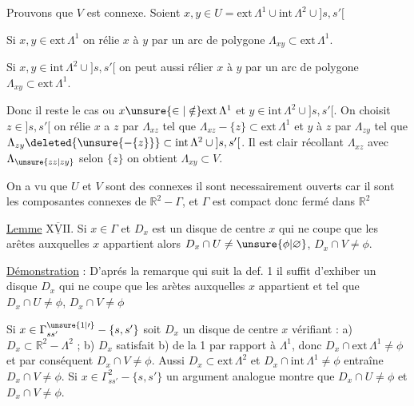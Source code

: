 Prouvons que $V$ est connexe. Soient $x,y\in U=\mathrm{ext}\,\Lambda^{1}\cup\mathrm{int}\,\Lambda^{2}\cup{]s,s'[}$

Si $x,y\in\mathrm{ext}\,\Lambda^{1}$ on rélie $x$ à $y$ par un arc de polygone $\Lambda_{xy}\subset\mathrm{ext}\,\Lambda^{1}$.

Si $x,y\in\mathrm{int}\,\Lambda^{2}\cup{]s,s'[}$ on peut aussi rélier $x$ à $y$ par un arc de polygone $\Lambda_{xy}\subset\mathrm{ext}\,\Lambda^{1}$.

Donc il reste le cas ou $x\unsure{\in|\notin}\mathrm{ext}\,\Lambda^{1}$ et $y\in\mathrm{int}\,\Lambda^{2}\cup{]s,s'[}$. On choisit $z\in{]s,s'[}$ on rélie $x$ a $z$ par $\Lambda_{xz}$ tel que $\Lambda_{xz}-\{z\}\subset\mathrm{ext}\,\Lambda^{1}$ et $y$ à $z$ par $\Lambda_{zy}$ tel que $\Lambda_{zy}\deleted{\unsure{-\{z\}}}\subset\mathrm{int}\,\Lambda^{2}\cup{]s,s'[}$. Il est clair  récollant $\Lambda_{xz}$ avec $\Lambda_{\unsure{zz|zy}}$ selon $\{z\}$ on obtient $\Lambda_{xy}\subset V$.

On a vu que $U$ et $V$ sont des connexes il sont necessairement ouverts car il sont les composantes connexes de $\mathbb{R}^{2}-\Gamma$, et $\Gamma$ est compact donc fermé dans $\mathbb{R}^{2}$\unsure{,|;|)}

\hfill {}
\uline{Lemme} $\underline{\overline{\mathrm{XVII}}}$. Si $x\in\Gamma$ et $D_x$ est un disque de centre $x$ qui ne coupe que les arêtes auxquelles $x$ appartient alors $D_x\cap U\ne\unsure{\phi|\varnothing}$, $D_x\cap V\ne\phi$.

\uline{Démonstration} : D'aprés la remarque qui suit la def. 1 il suffit d'exhiber un disque $D_x$ qui ne coupe que les arètes auxquelles $x$ appartient et tel que $D_x\cap U\ne\phi$, $D_x\cap V\ne\phi$

Si $x\in\Gamma^{\unsure{1|\prime}}_{ss'}-\{s,s'\}$ soit $D_x$ un disque de centre $x$ vérifiant : a) $D_x\subset\mathbb{R}^{2}-\Lambda^{2}$ ; b) $D_x$ satisfait b) de la  1 par rapport à $\Lambda^{1}$, donc $D_x\cap\mathrm{ext}\,\Lambda^{1}\ne\phi$ et par conséquent $D_x\cap V\ne\phi$. Aussi $D_x\subset\mathrm{ext}\,\Lambda^{2}$ et $D_x\cap\mathrm{int}\,\Lambda^{1}\ne\phi$ entraîne $D_x\cap V\ne\phi$. Si $x\in\Gamma^{2}_{ss'}-\{s,s'\}$ un argument analogue montre que $D_x\cap U\ne\phi$ et $D_x\cap V\ne\phi$.

